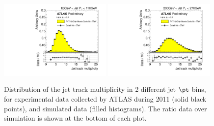 \begin{figure}[tp]
\centering
\includegraphics[width=0.49\textwidth]{FIGS/dataMC/FullDataVarNtrkPT080.pdf}
\includegraphics[width=0.49\textwidth]{FIGS/dataMC/FullDataVarNtrkPT200.pdf}
\caption{ Distribution of the jet track multiplicity in 2 different jet $\pt$ bins, for experimental data  collected by ATLAS during 2011 (solid black points), and simulated data (filled histograms). The ratio data over simulation is shown at the bottom of each plot.}
\label{fig:datamcinputvarsNTRK}
\end{figure}



